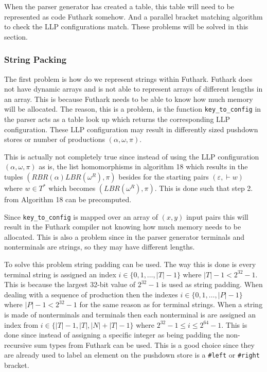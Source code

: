 When the parser generator has created a table, this table will need to be represented as code Futhark somehow. And a parallel bracket matching algorithm to check the LLP configurations match. These problems will be solved in this section.
\subsubsection{String Packing}
The first problem is how do we represent strings within Futhark. Futhark does not have dynamic arrays and is not able to represent arrays of different lengths in an array. This is because Futhark needs to be able to know how much memory will be allocated. The reason, this is a problem, is the function \lstinline|key_to_config| in the parser acts as a table look up which returns the corresponding LLP configuration. These LLP configuration may result in differently sized pushdown stores or number of productions $(\alpha, \omega, \pi)$.

This is actually not completely true since instead of using the LLP configuration $(\alpha, \omega, \pi)$ as is, the list homomorphisms in algorithm 18 \cite[18]{Vagner2007} which results in the tuples $(RBR(\alpha)LBR(\omega^R), \pi)$ besides for the starting pairs $(\varepsilon, \vdash w)$ where $w \in T^*$ which becomes $(LBR(\omega^R), \pi)$. This is done such that step 2. from Algorithm 18 \cite[18]{Vagner2007} can be precomputed.

Since \lstinline|key_to_config| is mapped over an array of $(x,y)$ input pairs this will result in the Futhark compiler not knowing how much memory needs to be allocated. This is also a problem since in the parser generator terminals and nonterminals are strings, so they may have different lengths.

To solve this problem string padding can be used. The way this is done is every terminal string is assigned an index $i \in \{0, 1, \dots, |T| - 1\}$ where $|T| - 1 < 2^{32} - 1$. This is because the largest 32-bit value of $2^{32} - 1$ is used as string padding. When dealing with a sequence of production then the indexes $i \in \{0, 1, \dots, |P| - 1\}$ where $|P| - 1 < 2^{32} - 1$ for the same reason as for terminal strings. When a string is made of nonterminals and terminals then each nonterminal is are assigned an index from $i \in \{|T| - 1, |T|, |N| + |T| - 1\}$ where $2^{32} - 1 \leq i \leq 2^{64} - 1$. This is done since instead of assigning a specific integer as being padding the non-recursive sum types from Futhark can be used. This is a good choice since they are already used to label an element on the pushdown store is a \lstinline|#left| or \lstinline|#right| bracket.

